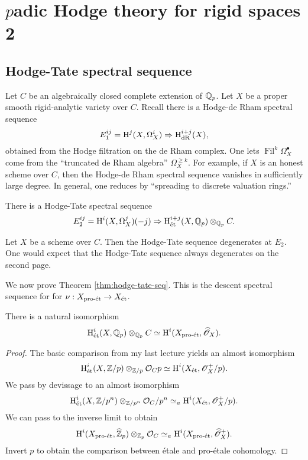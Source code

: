 
\section{\texorpdfstring{$p$}-adic Hodge theory for rigid spaces 2}




\subsection{Hodge-Tate spectral sequence}

Let $C$ be an algebraically closed complete extension of $\mathbb{Q}_p$. Let $X$ be a 
proper smooth rigid-analytic variety over $C$. Recall there is a Hodge-de Rham 
spectral sequence 
\[
  E_1^{i j} = \operatorname{H}^j(X,\Omega_X^i) \Rightarrow \operatorname{H}_\text{dR}^{i+j}(X) ,
\]
obtained from the Hodge filtration on the de Rham complex. One lets 
$\operatorname{Fil}^k \Omega_X^\bullet$ come from the ``truncated 
de Rham algebra'' $\Omega_X^{\geqslant k}$. For example, if $X$ is an honest 
scheme over $C$, then the Hodge-de Rham spectral sequence vanishes in sufficiently 
large degree. In general, one reduces by ``spreading to discrete valuation rings.'' 

\begin{theorem}\label{thm:hodge-tate-seq}
There is a Hodge-Tate spectral sequence 
\[
  E_2^{i j} = \operatorname{H}^i(X,\Omega_X^j)(-j)\Rightarrow \operatorname{H}_{\textnormal{\'et}}^{i+j}(X,\mathbb{Q}_p)\otimes_{\mathbb{Q}_p} C .
\]
\end{theorem}

\begin{example}
Let $X$ be a scheme over $C$. Then the Hodge-Tate sequence degenerates at $E_2$. One 
would expect that the Hodge-Tate sequence always degenerates on the second page. 
\end{example}

We now prove Theorem \ref{thm:hodge-tate-seq}. This is the descent spectral sequence 
for for $\nu:X_{\textnormal{pro-\'et}}\to X_{\textnormal{\'et}}$. 

\begin{lemma}
There is a natural isomorphism 
\[
  \operatorname{H}_{\textnormal{\'et}}^i(X,\mathbb{Q}_p)\otimes_{\mathbb{Q}_p} C\simeq \operatorname{H}^i(X_{\textnormal{pro-\'et}},\widehat{\mathscr{O}}_X) .
\]
\end{lemma}
\begin{proof}
The 
basic comparison from my last lecture yields an almost isomorphism 
\[
  \operatorname{H}_{\textnormal{\'et}}^i(X,\mathbb{Z}/p)\otimes_{\mathbb{Z}/p} \mathcal{O}_Cp \simeq \operatorname{H}^i(X_{\textnormal{\'et}},\mathscr{O}_X^+/p) .
\]
We pass by devissage to an almost isomorphism 
\[
  \operatorname{H}_{\textnormal{\'et}}^i(X,\mathbb{Z}/p^n)\otimes_{\mathbb{Z}/p^n}\mathcal{O}_C/p^n \simeq_a \operatorname{H}^i(X_{\textnormal{\'et}},\mathscr{O}_X^+/p) .
\]
We can pass to the inverse limit to obtain 
\[
  \operatorname{H}^i(X_{\textnormal{pro-\'et}},\widehat{\mathbb{Z}}_p)\otimes_{\mathbb{Z}_p} \mathcal{O}_C \simeq_a \operatorname{H}^i(X_{\textnormal{pro-\'et}},\widehat{\mathscr{O}}_X^+) .
\]
Invert $p$ to obtain the comparison between \'etale and pro-\'etale cohomology. 
\end{proof}


